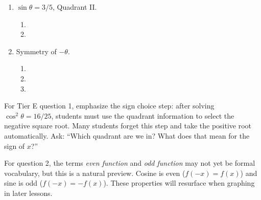 \documentclass[10pt]{article}
\begin{document}
\begin{tcolorbox}[colback=white, colframe=black!40,
    title=\textbf{Tier E --- Extend --- Key},
    fonttitle=\bfseries, arc=2mm, left=4mm, right=4mm, top=3mm, bottom=3mm]

\begin{enumerate}[leftmargin=1.8em, itemsep=4pt]
  \item $\sin\theta = 3/5$, Quadrant II.
        \begin{enumerate}[leftmargin=1.4em, itemsep=3pt]
          \item[(a)] 
          \item[(b)] 
        \end{enumerate}

  \item Symmetry of $-\theta$.
        \begin{enumerate}[leftmargin=1.4em, itemsep=3pt]
          \item[(a)] 
          \item[(b)] 
          \item[(c)] 
        \end{enumerate}
\end{enumerate}

\begin{teachernote}
For Tier E question 1, emphasize the sign choice step: after solving $\cos^2\theta = 16/25$,
students must use the quadrant information to select the negative square root. Many students
forget this step and take the positive root automatically. Ask: ``Which quadrant are we in?
What does that mean for the sign of $x$?''

For question 2, the terms \emph{even function} and \emph{odd function} may not yet be formal
vocabulary, but this is a natural preview. Cosine is even ($f(-x) = f(x)$) and sine is odd
($f(-x) = -f(x)$). These properties will resurface when graphing in later lessons.
\end{teachernote}
\end{tcolorbox}
\end{document}

